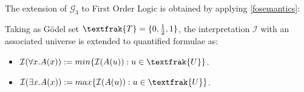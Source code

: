 			The extension of $\mathcal{G}_3$ to First Order Logic is obtained by applying \ref{fosemantics}:
			
			\begin{prop}\label{fog3}
				Taking as Gödel set $\textfrak{T} = \{0, \frac{1}{2}, 1\}$, the interpretation $\mathcal{I}$ with an associated universe  is extended to quantified formulae as:
				\begin{itemize}
					\item $\mathcal{I}(\forall x.A(x)) := min \{\mathcal{I}(A(u)) : u \in \textfrak{U}\}$.
					\item $\mathcal{I}(\exists x.A(x)) := max \{\mathcal{I}(A(u)) : u \in \textfrak{U}\}$.
				\end{itemize}
			\end{prop}
			
				\newpage
			${}$ \newpage
		
		
		
		
		
		
		
	
	